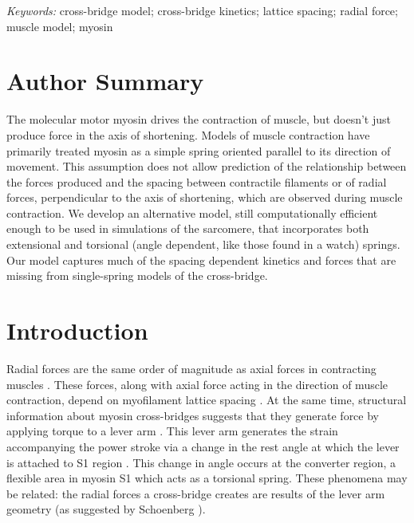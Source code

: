 \documentclass[10pt]{article}
\newcommand{\citep}[1]{\cite{#1}} %
\begin{document}
\emph{Keywords:} cross-bridge model; cross-bridge kinetics; lattice spacing; radial force; muscle model; myosin 


\section*{Author Summary} %
The molecular motor myosin drives the contraction of muscle, but doesn't just produce force in the axis of shortening.
Models of muscle contraction have primarily treated myosin as a simple spring oriented parallel to its direction of movement. 
This assumption does not allow prediction of the relationship between the forces produced and the spacing between contractile filaments or of radial forces, perpendicular to the axis of shortening, which are observed during muscle contraction. 
We develop an alternative model, still computationally efficient enough to be used in simulations of the sarcomere, that incorporates both extensional and torsional (angle dependent, like those found in a watch) springs. 
Our model captures much of the spacing dependent kinetics and forces that are missing from single-spring models of the cross-bridge.


\section*{Introduction} %

Radial forces are the same order of magnitude as axial forces in contracting muscles \citep{Maughan1981, Cecchi1990, Millman1998}. 
These forces, along with axial force acting in the direction of muscle contraction, depend on myofilament lattice spacing \citep{Bagni1994, Fuchs2005}. 
At the same time, structural information about myosin cross-bridges suggests that they generate force by applying torque to a lever arm \citep{Rayment1993, Uyeda1996, Huxley2000}.
This lever arm generates the strain accompanying the power stroke via a change in the rest angle at which the lever is attached to S1 region \citep{Huxley2000, Houdusse2001}. 
This change in angle occurs at the converter region, a flexible area in myosin S1 which acts as a torsional spring. 
These phenomena may be related: the radial forces a cross-bridge creates are results of the lever arm geometry (as suggested by Schoenberg \citep{Schoenberg1980b}). 
\end{document}
